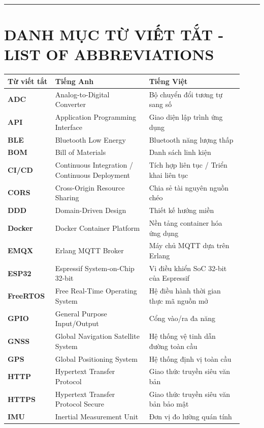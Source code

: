 \documentclass[13pt,a4paper]{extarticle}
\newcounter{none} %
\newcommand{\thesislongtableorignewline}{}
\let\thesislongtableorignewline\\
\renewcommand{\\}{\thesislongtableorignewline\hline}%
\let\\\thesislongtableorignewline
\newcommand{\majorheading}[1]{\clearpage\section*{#1}}
\begin{document}
\begin{center}\rule{0.5\linewidth}{0.5pt}\end{center}

\majorheading{DANH MỤC TỪ VIẾT TẮT - LIST OF ABBREVIATIONS}\label{danh-mux1ee5c-tux1eeb-viux1ebft-tux1eaft---list-of-abbreviations}

{\def\LTcaptype{none} %
\begin{longtable}{|C{0.18\linewidth}|L{0.37\linewidth}|L{0.37\linewidth}|}
\hline \textbf{} \textbf{Từ viết tắt} & \textbf{Tiếng Anh} & \textbf{Tiếng Việt} \\
\hline
\endhead
\hline
\endlastfoot
\textbf{ADC} & Analog-to-Digital Converter & Bộ chuyển đổi tương tự sang
số \\
\textbf{API} & Application Programming Interface & Giao diện lập trình
ứng dụng \\
\textbf{BLE} & Bluetooth Low Energy & Bluetooth năng lượng thấp \\
\textbf{BOM} & Bill of Materials & Danh sách linh kiện \\
\textbf{CI/CD} & Continuous Integration / Continuous Deployment & Tích
hợp liên tục / Triển khai liên tục \\
\textbf{CORS} & Cross-Origin Resource Sharing & Chia sẻ tài nguyên nguồn
chéo \\
\textbf{DDD} & Domain-Driven Design & Thiết kế hướng miền \\
\textbf{Docker} & Docker Container Platform & Nền tảng container hóa ứng
dụng \\
\textbf{EMQX} & Erlang MQTT Broker & Máy chủ MQTT dựa trên Erlang \\
\textbf{ESP32} & Espressif System-on-Chip 32-bit & Vi điều khiển SoC
32-bit của Espressif \\
\textbf{FreeRTOS} & Free Real-Time Operating System & Hệ điều hành thời
gian thực mã nguồn mở \\
\textbf{GPIO} & General Purpose Input/Output & Cổng vào/ra đa năng \\
\textbf{GNSS} & Global Navigation Satellite System & Hệ thống vệ tinh
dẫn đường toàn cầu \\
\textbf{GPS} & Global Positioning System & Hệ thống định vị toàn cầu \\
\textbf{HTTP} & Hypertext Transfer Protocol & Giao thức truyền siêu văn
bản \\
\textbf{HTTPS} & Hypertext Transfer Protocol Secure & Giao thức truyền
siêu văn bản bảo mật \\
\textbf{IMU} & Inertial Measurement Unit & Đơn vị đo lường quán tính \\

\end{longtable}}
\end{document}
